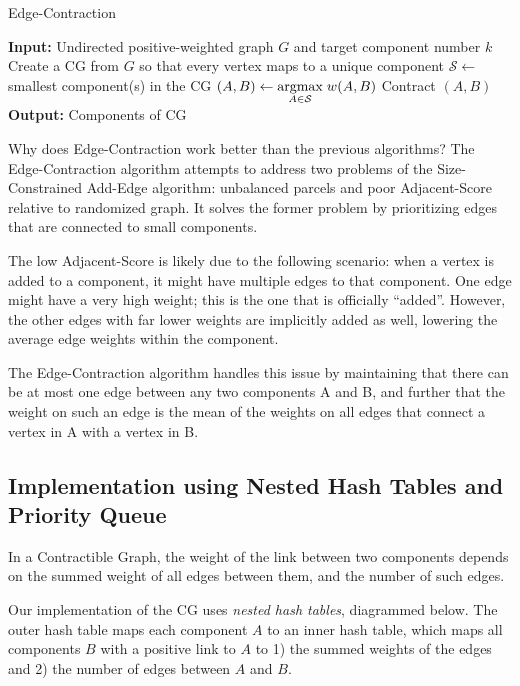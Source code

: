 \begin{algorithm}
\caption{Edge-Contraction}
\begin{algorithmic}
\State \textbf{Input:} Undirected positive-weighted graph $G$ and
       target component number $k$
\State Create a CG from $G$ so that every vertex maps to
       a unique component
\Repeat
\State $\mathcal{S} \gets$ smallest component(s) in the CG
\State $(A,B) \gets \underset{A \in \mathcal{S}}{\mathrm{arg max}}\; w(A,B)$
\State Contract $(A,B)$
\State \textbf{Output:} Components of CG
\end{algorithmic}
\end{algorithm}

Why does Edge-Contraction work better than the previous algorithms?
The Edge-Contraction algorithm attempts to address two problems of
the Size-Constrained Add-Edge algorithm: unbalanced parcels and poor
Adjacent-Score relative to randomized graph. It solves the former
problem by prioritizing edges that are connected to small components.

The low Adjacent-Score is likely due to the following scenario:
when a vertex is added to a component, it might have multiple
edges to that component. One edge might have a very high weight; this is
the one that is officially ``added''. However, the other edges with far
lower weights are implicitly added as well, lowering the average edge
weights within the component.

The Edge-Contraction algorithm handles this issue by maintaining that
there can be at most one edge between any two components A and B, and
further that the weight on such an edge is the mean of the weights on
all edges that connect a vertex in A with a vertex in B.

\subsection{Implementation using Nested Hash Tables and Priority Queue}

In a Contractible Graph, the weight of the link between two components
depends on the summed weight of all edges between them, and the number
of such edges.

Our implementation of the CG uses \textit{nested hash tables},
diagrammed below. The outer hash table maps each component $A$ to an
inner hash table, which maps all components $B$ with a positive link to
$A$ to 1) the summed weights of the edges and 2) the number of edges
between $A$ and $B$.

